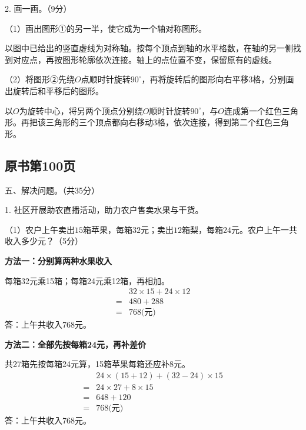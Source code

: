 2. 画一画。（9分）\par （1）画出图形①的另一半，使它成为一个轴对称图形。\par
{}
\begin{BookAnswer}
以图中已给出的竖直虚线为对称轴。按每个顶点到轴的水平格数，在轴的另一侧找到对应点，再按图形轮廓依次连接。轴上的点位置不变，保留原有的虚线。
\end{BookAnswer}

（2）将图形②先绕\(O\)点顺时针旋转\(90^\circ\)，再将旋转后的图形向右平移\(3\)格，分别画出旋转后和平移后的图形。\par
{}
\begin{BookAnswer}
以\(O\)为旋转中心，将另两个顶点分别绕\(O\)顺时针旋转\(90^\circ\)，与\(O\)连成第一个红色三角形。再把该三角形的三个顶点都向右移动\(3\)格，依次连接，得到第二个红色三角形。
\end{BookAnswer}



\subsection*{原书第100页}

五、解决问题。（共35分）\par 1. 社区开展助农直播活动，助力农户售卖水果与干货。\par （1）农户上午卖出\(15\)箱苹果，每箱\(32\)元；卖出\(12\)箱梨，每箱\(24\)元。农户上午一共收入多少元？（5分）\par
\begin{BookAnswer}
\textbf{方法一：分别算两种水果收入}\par 每箱32元乘15箱；每箱24元乘12箱，再相加。\[\begin{aligned} &32\times15+24\times12\\ ={}&480+288\\ ={}&768\text{(元)}\end{aligned}\]答：上午共收入768元。\par \textbf{方法二：全部先按每箱24元，再补差价}\par 共27箱先按每箱24元算，15箱苹果每箱还应补8元。\[\begin{aligned} &24\times(15+12)+(32-24)\times15\\ ={}&24\times27+8\times15\\ ={}&648+120\\ ={}&768\text{(元)}\end{aligned}\]答：上午共收入768元。\par
\end{BookAnswer}

